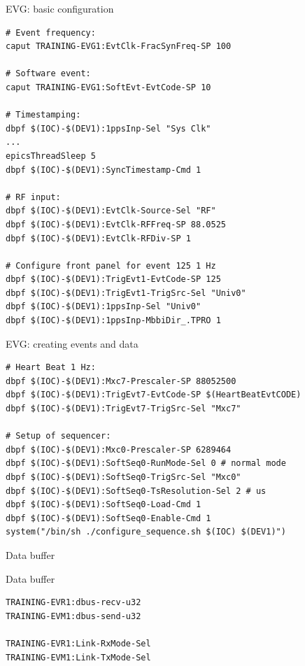 \documentclass[
  9pt
  , table
  , ignorenonframetext
]{beamer}
\begin{document}
\begin{frame}[fragile]{EVG: basic configuration}
\begin{lstlisting}[style=termstyle,breaklines=true,basicstyle=\scriptsize]
# Event frequency:
caput TRAINING-EVG1:EvtClk-FracSynFreq-SP 100

# Software event:
caput TRAINING-EVG1:SoftEvt-EvtCode-SP 10

# Timestamping:
dbpf $(IOC)-$(DEV1):1ppsInp-Sel "Sys Clk"
...
epicsThreadSleep 5
dbpf $(IOC)-$(DEV1):SyncTimestamp-Cmd 1

# RF input:
dbpf $(IOC)-$(DEV1):EvtClk-Source-Sel "RF"
dbpf $(IOC)-$(DEV1):EvtClk-RFFreq-SP 88.0525
dbpf $(IOC)-$(DEV1):EvtClk-RFDiv-SP 1

# Configure front panel for event 125 1 Hz
dbpf $(IOC)-$(DEV1):TrigEvt1-EvtCode-SP 125
dbpf $(IOC)-$(DEV1):TrigEvt1-TrigSrc-Sel "Univ0"
dbpf $(IOC)-$(DEV1):1ppsInp-Sel "Univ0"
dbpf $(IOC)-$(DEV1):1ppsInp-MbbiDir_.TPRO 1

\end{lstlisting}
\end{frame}

\begin{frame}[fragile]{EVG: creating events and data}
\begin{lstlisting}[style=termstyle,breaklines=true,basicstyle=\scriptsize]
# Heart Beat 1 Hz:
dbpf $(IOC)-$(DEV1):Mxc7-Prescaler-SP 88052500
dbpf $(IOC)-$(DEV1):TrigEvt7-EvtCode-SP $(HeartBeatEvtCODE)
dbpf $(IOC)-$(DEV1):TrigEvt7-TrigSrc-Sel "Mxc7"

# Setup of sequencer:
dbpf $(IOC)-$(DEV1):Mxc0-Prescaler-SP 6289464
dbpf $(IOC)-$(DEV1):SoftSeq0-RunMode-Sel 0 # normal mode
dbpf $(IOC)-$(DEV1):SoftSeq0-TrigSrc-Sel "Mxc0"
dbpf $(IOC)-$(DEV1):SoftSeq0-TsResolution-Sel 2 # us
dbpf $(IOC)-$(DEV1):SoftSeq0-Load-Cmd 1
dbpf $(IOC)-$(DEV1):SoftSeq0-Enable-Cmd 1
system("/bin/sh ./configure_sequence.sh $(IOC) $(DEV1)")

\end{lstlisting}
\end{frame}

\begin{frame}[fragile]{Data buffer}
  \begin{block}{Data buffer}
\begin{lstlisting}[style=termstyle,breaklines=true,basicstyle=\scriptsize]
TRAINING-EVR1:dbus-recv-u32
TRAINING-EVM1:dbus-send-u32

TRAINING-EVR1:Link-RxMode-Sel
TRAINING-EVM1:Link-TxMode-Sel
\end{lstlisting}
  \end{block}
\end{frame}
\end{document}
